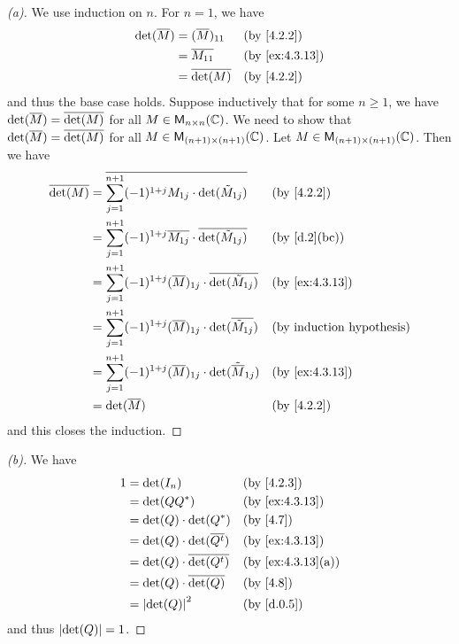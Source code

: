 \begin{proof}[(a)]
	We use induction on \(n\).
	For \(n = 1\), we have
	\begin{align*}
		\det(\conj{M}) & = (\conj{M})_{1 1} &  & \by{4.2.2}     \\
		               & = \conj{M_{1 1}}   &  & \by{ex:4.3.13} \\
		               & = \conj{\det(M)}   &  & \by{4.2.2}
	\end{align*}
	and thus the base case holds.
	Suppose inductively that for some \(n \geq 1\), we have \(\det(\overline{M}) = \overline{\det(M)}\) for all \(M \in \mathsf{M}_{{n} \times n}({\mathbb{C}})\).
	We need to show that \(\det(\overline{M}) = \overline{\det(M)}\) for all \(M \in \mathsf{M}_{{(n + 1)} \times (n + 1)}({\mathbb{C}})\).
	Let \(M \in \mathsf{M}_{{(n + 1)} \times (n + 1)}({\mathbb{C}})\).
	Then we have
	\begin{align*}
		\conj{\det(M)} & = \conj{\sum_{j = 1}^{n + 1} (-1)^{1 + j} M_{1 j} \cdot \det(\tilde{M}_{1 j})}          &  & \by{4.2.2}                       \\
		               & = \sum_{j = 1}^{n + 1} (-1)^{1 + j} \conj{M_{1 j}} \cdot \conj{\det(\tilde{M}_{1 j})}   &  & \by{d.2}[bc]                     \\
		               & = \sum_{j = 1}^{n + 1} (-1)^{1 + j} (\conj{M})_{1 j} \cdot \conj{\det(\tilde{M}_{1 j})} &  & \by{ex:4.3.13}                   \\
		               & = \sum_{j = 1}^{n + 1} (-1)^{1 + j} (\conj{M})_{1 j} \cdot \det(\conj{\tilde{M}_{1 j}}) &  & \text{(by induction hypothesis)} \\
		               & = \sum_{j = 1}^{n + 1} (-1)^{1 + j} (\conj{M})_{1 j} \cdot \det(\tilde{\conj{M}}_{1 j}) &  & \by{ex:4.3.13}                   \\
		               & = \det(\conj{M})                                                                        &  & \by{4.2.2}
	\end{align*}
	and this closes the induction.
\end{proof}

\begin{proof}[(b)]
	We have
	\begin{align*}
		1 & = \det(I_n)                         &  & \by{4.2.3}        \\
		  & = \det(Q Q^*)                       &  & \by{ex:4.3.13}    \\
		  & = \det(Q) \cdot \det(Q^*)           &  & \by{4.7}          \\
		  & = \det(Q) \cdot \det(\conj{\tp{Q}}) &  & \by{ex:4.3.13}    \\
		  & = \det(Q) \cdot \conj{\det(\tp{Q})} &  & \by{ex:4.3.13}[a] \\
		  & = \det(Q) \cdot \conj{\det(Q)}      &  & \by{4.8}          \\
		  & = \abs{\det(Q)}^2                   &  & \by{d.0.5}
	\end{align*}
	and thus \(\left\lvert\det(Q)\right\rvert = 1\).
\end{proof}

